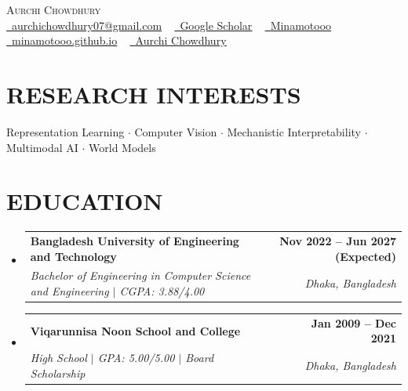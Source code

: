 \documentclass[letterpaper,11pt]{article}
\makeatletter
\newcommand{\resumeSubheading}[4]{
  \vspace{-2pt}\item
    \begin{tabular*}{1.0\textwidth}[t]{l@{\extracolsep{\fill}}r}
      \textbf{#1} & \textbf{\small #2} \\
      \textit{\small#3} & \textit{\small #4} \\
    \end{tabular*}\vspace{-4pt}
}
\newcommand{\resumeSubHeadingListStart}{\begin{itemize}[leftmargin=0.0in, label={}]}
\newcommand{\resumeSubHeadingListEnd}{\end{itemize}}
\makeatother
\begin{document}
\begin{center}
    {\Huge \scshape Aurchi Chowdhury} \\ \vspace{4pt}
    \small \href{mailto:aurchichowdhury07@gmail.com}{\raisebox{-0.2\height}\faEnvelope\  \underline{aurchichowdhury07@gmail.com}} ~
    \href{https://scholar.google.com/citations?hl=en&user=VLcf3FAAAAAJ}{\raisebox{-0.2\height}\faGraduationCap\ \underline{Google Scholar}} ~
    \href{https://github.com/Minamotooo}{\raisebox{-0.2\height}\faGithub\ \underline{Minamotooo}} ~
    \href{https://minamotooo.github.io/}{\raisebox{-0.2\height}\faGlobe\ \underline{minamotooo.github.io}} ~
    \href{https://www.linkedin.com/in/aurchichowdhury/}{\raisebox{-0.2\height}\faLinkedin\ \underline{Aurchi Chowdhury}}
    \vspace{4pt}
\end{center}


\section{RESEARCH INTERESTS}
 \begin{itemize}[leftmargin=0.15in, label={}]
    \small{\item{Representation Learning $\cdot$ Computer Vision $\cdot$ Mechanistic Interpretability $\cdot$ Multimodal AI $\cdot$ World Models}}
 \end{itemize}
\vspace{-10pt}

\section{EDUCATION}
  \resumeSubHeadingListStart
    \resumeSubheading
      {Bangladesh University of Engineering and Technology}{Nov 2022 -- Jun 2027 (Expected)}
      {Bachelor of Engineering in Computer Science and Engineering $|$ CGPA: 3.88/4.00}{Dhaka, Bangladesh}
    \resumeSubheading
      {Viqarunnisa Noon School and College}{Jan 2009 -- Dec 2021}
      {High School $|$ GPA: 5.00/5.00 $|$ Board Scholarship}{Dhaka, Bangladesh}
  \resumeSubHeadingListEnd
\vspace{-5pt}

\end{document}
